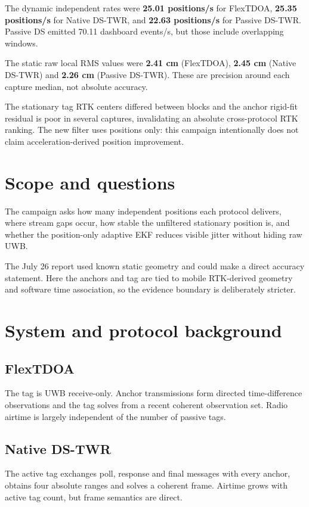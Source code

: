 \documentclass[10pt,a4paper]{article}
\begin{document}
The dynamic independent rates were \textbf{25.01 positions/s} for FlexTDOA, \textbf{25.35 positions/s} for Native DS-TWR, and \textbf{22.63 positions/s} for Passive DS-TWR. Passive DS emitted 70.11 dashboard events/s, but those include overlapping windows.

The static raw local RMS values were \textbf{2.41 cm} (FlexTDOA), \textbf{2.45 cm} (Native DS-TWR) and \textbf{2.26 cm} (Passive DS-TWR). These are precision around each capture median, not absolute accuracy.


The stationary tag RTK centers differed between blocks and the anchor rigid-fit
residual is poor in several captures, invalidating an absolute cross-protocol
RTK ranking. The new filter uses positions only: this campaign intentionally
does not claim acceleration-derived position improvement.

\section{Scope and questions}
The campaign asks how many independent positions each protocol delivers, where
stream gaps occur, how stable the unfiltered stationary position is, and whether
the position-only adaptive EKF reduces visible jitter without hiding raw UWB.

The July 26 report used known static geometry and could make a direct accuracy
statement. Here the anchors and tag are tied to mobile RTK-derived geometry and
software time association, so the evidence boundary is deliberately stricter.

\section{System and protocol background}
\subsection{FlexTDOA}
The tag is UWB receive-only. Anchor transmissions form directed time-difference
observations and the tag solves from a recent coherent observation set. Radio
airtime is largely independent of the number of passive tags.

\subsection{Native DS-TWR}
The active tag exchanges poll, response and final messages with every anchor,
obtains four absolute ranges and solves a coherent frame. Airtime grows with
active tag count, but frame semantics are direct.
\end{document}
